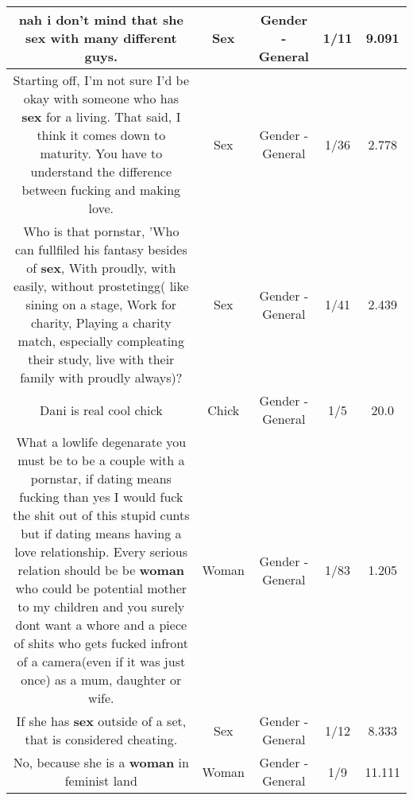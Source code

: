 \documentclass[11pt]{article}
\newlength\mylength
\begin{document}
\begin{center}
\begin{longtable}{|C{.65\mylength}|C{.30\mylength}|C{.12\mylength}|C{.12\mylength}|C{.12\mylength}|}
  \small nah i don't mind that she \textbf{sex} with many different guys.\normalsize   & Sex & Gender - General & 1/11 & 9.091 \\  \hline
  \small Starting off, I'm not sure I'd be okay with someone who has \textbf{sex} for a living. That said, I think it comes down to maturity. You have to understand the difference between fucking and making love.\normalsize   & Sex & Gender - General & 1/36 & 2.778 \\  \hline
  \small Who is that pornstar, 'Who can fullfiled his fantasy besides of \textbf{sex}, With proudly, with easily, without prostetingg( like sining on a stage, Work for charity, Playing a charity match, especially compleating their study, live with their family with proudly always)?\normalsize   & Sex & Gender - General & 1/41 & 2.439 \\  \hline
  \small Dani is real cool chick\normalsize   & Chick & Gender - General & 1/5 & 20.0 \\  \hline
  \small What a lowlife degenarate you must be to be a couple with a pornstar, if dating means fucking than yes I would fuck the shit out of this stupid cunts but if dating means having a love relationship. Every serious relation should be be \textbf{woman} who could be potential mother to my children and you surely dont want a whore and a piece of shits who gets fucked infront of a camera(even if it was just once) as a mum, daughter or wife.\normalsize   & Woman & Gender - General & 1/83 & 1.205 \\  \hline
  \small If she has \textbf{sex} outside of a set, that is considered cheating.\normalsize   & Sex & Gender - General & 1/12 & 8.333 \\  \hline
  \small No, because she is a \textbf{woman} in feminist land\normalsize   & Woman & Gender - General & 1/9 & 11.111 \\  \hline

\end{longtable}
\end{center}
\end{document}
